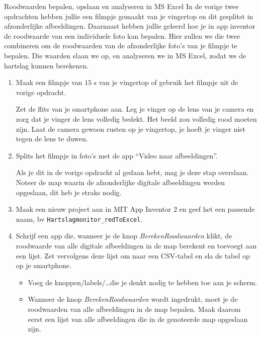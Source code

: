 \begin{opdracht}{Roodwaarden bepalen, opslaan en analyseren in MS Excel}
	In de vorige twee opdrachten hebben jullie een filmpje gemaakt van je vingertop en dit gesplitst in afzonderlijke afbeeldingen. Daarnaast hebben jullie geleerd hoe je in app inventor de roodwaarde van een individuele foto kan bepalen. Hier zullen we die twee combineren om de roodwaarden van de afzonderlijke foto's van je filmpje te bepalen. Die waarden slaan we op, en analyseren we in MS Excel, zodat we de hartslag kunnen berekenen.
	
\begin{enumerate}
	
	\item Maak een filmpje van $15~s$ van je vingertop of gebruik het filmpje uit de vorige opdracht.
	
	Zet de flits van je smartphone aan. Leg je vinger op de lens van je camera en zorg dat je vinger de lens volledig bedekt. Het beeld zou volledig rood moeten zijn. Laat de camera gewoon rusten op je vingertop, je hoeft je vinger niet tegen de lens te duwen.
	
	\item Splits het filmpje in foto's met de app \textquotedblleft Video naar afbeeldingen\textquotedblright.
	
	Als je dit in de vorige opdracht al gedaan hebt, mag je deze stap overslaan. Noteer de map waarin de afzonderlijke digitale afbeeldingen werden opgeslaan, dit heb je straks nodig.
	
	\item Maak een nieuw project aan in MIT App Inventor 2 en geef het een passende naam, bv \texttt{Hartslagmonitor\_redToExcel}. 
	
	\item Schrijf een app die, wanneer je de knop \emph{BerekenRoodwaarden} klikt, de roodwaarde van alle digitale afbeeldingen in de map berekent en toevoegt aan een lijst. Zet vervolgens deze lijst om naar een CSV-tabel en sla de tabel op op je smartphone.

	
		\begin{itemize}
			\item Voeg de knoppen/labels/\ldots die je denkt nodig te hebben toe aan je scherm.
			\item Wanneer de knop \emph{BerekenRoodwaarden} wordt ingedrukt, moet je de roodwaarden van alle afbeeldingen in de map bepalen. Maak daarom eerst een lijst van alle afbeeldingen die in de genoteerde map opgeslaan zijn. 
			

\end{itemize}
\end{enumerate}
\end{opdracht}
